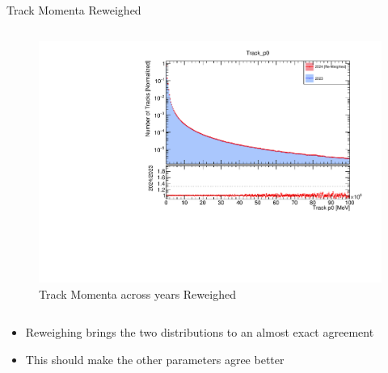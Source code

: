 \begin{frame}{Track Momenta Reweighed}
\begin{columns}
\begin{column}{0.5\linewidth}
\begin{figure}
                \includegraphics[width=\linewidth]{./ReweighedPlots/Track_p0_Reweighted.pdf}
                \caption{Track Momenta across years Reweighed}
            \end{figure}
        \end{column}
    \end{columns}
    \begin{itemize}
        \item Reweighing brings the two distributions to an almost exact agreement
        \item This should make the other parameters agree better
    \end{itemize}
\end{frame}

